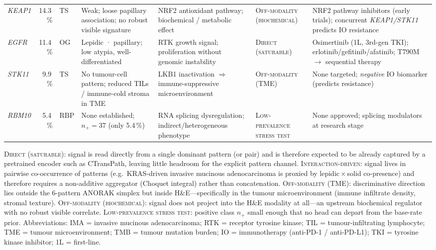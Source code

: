 \begin{table}[!htbp]
{\begin{tabular}{@{} l r l p{2.6cm} p{2.6cm} l p{2.6cm} @{}}
\textit{KEAP1} & 14.3\,\% & TS  &
Weak; loose papillary association; no robust visible signature &
NRF2 antioxidant pathway; biochemical / metabolic effect &
\textsc{Off-modality (biochemical)} &
NRF2 pathway inhibitors (early trials); concurrent
\textit{KEAP1/STK11} predicts IO resistance
\\[3pt]

\textit{EGFR}  & 11.4\,\% & OG  &
Lepidic · papillary; low atypia, well-differentiated &
RTK growth signal; proliferation without genomic instability &
\textsc{Direct (saturable)} &
Osimertinib (1L, 3rd-gen TKI); erlotinib/gefitinib/afatinib;
T790M $\to$ sequential therapy
\\[3pt]

\textit{STK11} & 9.9\,\% & TS  &
No tumour-cell pattern; reduced TILs / immune-cold stroma in TME &
LKB1 inactivation $\Rightarrow$ immune-suppressive
microenvironment &
\textsc{Off-modality (TME)} &
None targeted; \emph{negative} IO biomarker (predicts resistance)
\\[3pt]

\textit{RBM10} & 5.4\,\% & RBP &
None established; $n_+ = 37$ (only 5.4\,\%) &
RNA splicing dysregulation; indirect/heterogeneous phenotype &
\textsc{Low-prevalence stress test} &
None approved; splicing modulators at research stage
\\

\bottomrule
\end{tabular}}
\begin{flushleft}
\scriptsize
\textsc{Direct (saturable)}: signal is read directly from a single
dominant pattern (or pair) and is therefore expected to be already
captured by a pretrained encoder such as CTransPath, leaving little
headroom for the explicit pattern channel.
\textsc{Interaction-driven}: signal lives in pairwise co-occurrence
of patterns (e.g.\ KRAS-driven invasive mucinous adenocarcinoma is
proxied by lepidic\,$\times$\,solid co-presence) and therefore
requires a non-additive aggregator (Choquet integral) rather than
concatenation.
\textsc{Off-modality (TME)}: discriminative direction lies outside
the 6-pattern ANORAK simplex but inside H\&E---specifically in the
tumour microenvironment (immune infiltrate density, stromal
texture).
\textsc{Off-modality (biochemical)}: signal does not project into
the H\&E modality at all---an upstream biochemical regulator with no
robust visible correlate.
\textsc{Low-prevalence stress test}: positive class $n_+$ small
enough that no head can depart from the base-rate prior.
Abbreviations: IMA = invasive mucinous adenocarcinoma;
RTK = receptor tyrosine kinase;
TIL = tumour-infiltrating lymphocyte;
TME = tumour microenvironment;
TMB = tumour mutation burden;
IO = immunotherapy (anti-PD-1 / anti-PD-L1);
TKI = tyrosine kinase inhibitor;
1L = first-line.
\end{flushleft}
\end{table}

